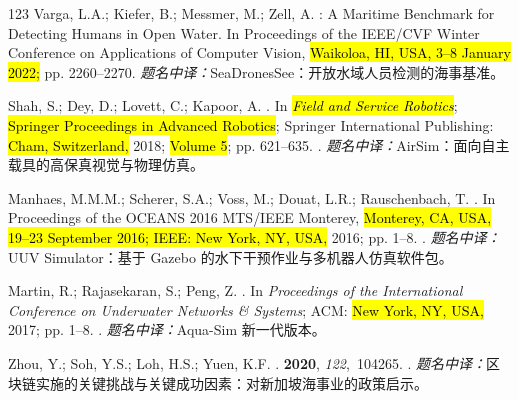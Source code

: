 \begin{thebibliography}{123}
Varga, L.A.; Kiefer, B.; Messmer, M.; Zell, A.
: A Maritime Benchmark for Detecting Humans in Open
  Water.
\newblock In Proceedings of the IEEE/CVF Winter Conference on Applications of
  Computer Vision, \hl{Waikoloa, HI, USA, 3--8 January 2022;} pp. 2260--2270.
\newblock \textit{题名中译：}SeaDronesSee：开放水域人员检测的海事基准。

Shah, S.; Dey, D.; Lovett, C.; Kapoor, A.
. In {\em \hl{Field and Service Robotics}}; \hl{Springer Proceedings in Advanced Robotics}; Springer
  International Publishing: \hl{Cham, Switzerland,}   2018; \hl{Volume 5}; pp. 621--635.
.
\newblock \textit{题名中译：}AirSim：面向自主载具的高保真视觉与物理仿真。

Manhaes, M.M.M.; Scherer, S.A.; Voss, M.; Douat, L.R.; Rauschenbach, T.
.
\newblock In Proceedings of the OCEANS 2016 MTS/IEEE Monterey, \hl{Monterey, CA, USA, 19--23 September 2016; IEEE: New York, NY, USA,}  2016; pp.
  1--8.
.
\newblock \textit{题名中译：}UUV Simulator：基于 Gazebo 的水下干预作业与多机器人仿真软件包。

Martin, R.; Rajasekaran, S.; Peng, Z.
.
\newblock In \emph{Proceedings of the International Conference on Underwater Networks
  \& Systems}; ACM: \hl{New York, NY, USA,}  2017; pp. 1--8.
.
\newblock \textit{题名中译：}Aqua-Sim 新一代版本。

Zhou, Y.; Soh, Y.S.; Loh, H.S.; Yuen, K.F.
.
 {\bf 2020}, {\em 122},~104265.
.
\newblock \textit{题名中译：}区块链实施的关键挑战与关键成功因素：对新加坡海事业的政策启示。


\end{thebibliography}
